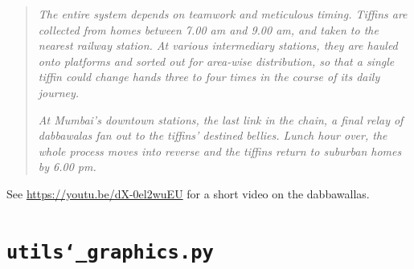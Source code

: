 \documentclass[12pt, english, oneside]{report}
\begin{document}
\begin{appendices}
\begin{quote}
\textit{The entire system depends on teamwork and meticulous timing. Tiffins are collected from homes 
between 7.00 am and 9.00 am, and taken to the nearest railway station. At various intermediary stations, 
they are hauled onto platforms and sorted out for area-wise distribution, so that a single tiffin could 
change hands three to four times in the course of its daily journey.}

\textit{At Mumbai's downtown stations, the last link in the chain, a final relay of dabbawalas fan 
out to the tiffins' destined bellies. Lunch hour over, the whole process moves into reverse and the 
tiffins return to suburban homes by 6.00 pm.}
\end{quote}

See \url{https://youtu.be/dX-0el2wuEU} for a short video on the dabbawallas. 

\chapter{\texttt{utils\char`_graphics.py}}


\end{appendices}
\end{document}
